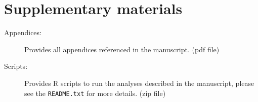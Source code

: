 \documentclass[12pt]{article}
\begin{document}
\section{Supplementary materials}\label{sec:Supp}

\begin{description}

\item[Appendices:] Provides all appendices referenced in the manuscript. (pdf file)

\item[Scripts:] Provides R scripts to run the analyses described in the manuscript, please see the \texttt{README.txt} for more details. (zip file)

\end{description}

\end{document}
